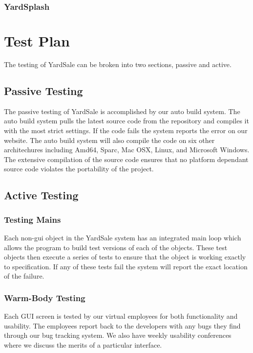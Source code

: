 \documentclass{report}
\begin{document}
	\subsection{YardSplash}

\chapter{Test Plan}

The testing of YardSale can be broken into two sections, passive and active.

\section{Passive Testing}

The passive testing of YardSale is accomplished by our auto build system.  The auto build system pulls the latest source
code from the repository and compiles it with the most strict settings.  If the code fails the system reports the error
on our website.  The auto build system will also compile the code on six other architechures including Amd64, Sparc, Mac OSX,
Linux, and Microsoft Windows.  The extensive compilation of the source code ensures that no platform dependant source code
violates the portability of the project.

\section{Active Testing}

\subsection{Testing Mains}
Each non-gui object in the YardSale system has an integrated main loop which allows the program to build test versions of
each of the objects.  These test objects then execute a series of tests to ensure that the object is working exactly to specification.
If any of these tests fail the system will report the exact location of the failure.

\subsection{Warm-Body Testing}
Each GUI screen is tested by our virtual employees for both functionality and usability.  The employees report back to the developers with any
bugs they find through our bug tracking system.  We also have weekly usability conferences where we discuss the merits of a particular interface.
\end{document}
